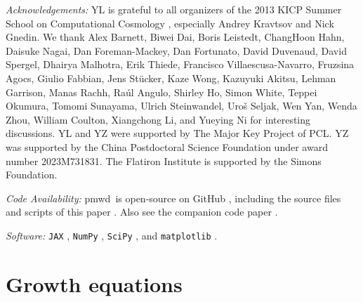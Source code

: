 \documentclass[modern, dvipsnames]{aastex631}
\newcommand{\pmwd}{{\usefont{T1}{nova}{m}{sl}pmwd}}
\begin{document}
\vspace{1em}
\textit{\large Acknowledgements:}
YL is grateful to all organizers of the 2013 KICP Summer School on
Computational Cosmology \citep{KICPsummer2013}, especially Andrey
Kravtsov and Nick Gnedin.
We thank Alex Barnett, Biwei Dai, Boris Leistedt, ChangHoon Hahn,
Daisuke Nagai, Dan Foreman-Mackey, Dan Fortunato, David Duvenaud, David
Spergel, Dhairya Malhotra, Erik Thiede, Francisco Villaescusa-Navarro,
Fruzsina Agocs, Giulio Fabbian, Jens St\"ucker, Kaze Wong, Kazuyuki
Akitsu, Lehman Garrison, Manas Rachh, Ra\'ul Angulo, Shirley Ho, Simon
White, Teppei Okumura, Tomomi Sunayama, Ulrich Steinwandel, Uro\v{s}
Seljak, Wen Yan, Wenda Zhou, William Coulton, Xiangchong Li, and Yueying
Ni for interesting discussions.
YL and YZ were supported by The Major Key Project of PCL.
YZ was supported by the China Postdoctoral Science Foundation under
award number 2023M731831.
The Flatiron Institute is supported by the Simons Foundation.


\vspace{1em}
\textit{\large Code Availability:}
\pmwd\ is open-source on GitHub
\href{https://github.com/eelregit/pmwd}{\faGithub}, including the source
files and scripts of this paper
\href{https://github.com/eelregit/pmwd/tree/master/docs/papers/adjoint}{\faFile}.
Also see the companion code paper \citep{pmwd}
\href{https://github.com/eelregit/pmwd/tree/master/docs/papers/pmwd}{\faFile}.


\vspace{1em}
\textit{\large Software:}
\texttt{JAX} \citep{JAX}, \texttt{NumPy} \citep{NumPy}, \texttt{SciPy}
\citep{SciPy}, and \texttt{matplotlib} \citep{matplotlib}.



\clearpage
\appendix


\vspace{1em}
\section{Growth equations}
\label{app:growth}
\end{document}
